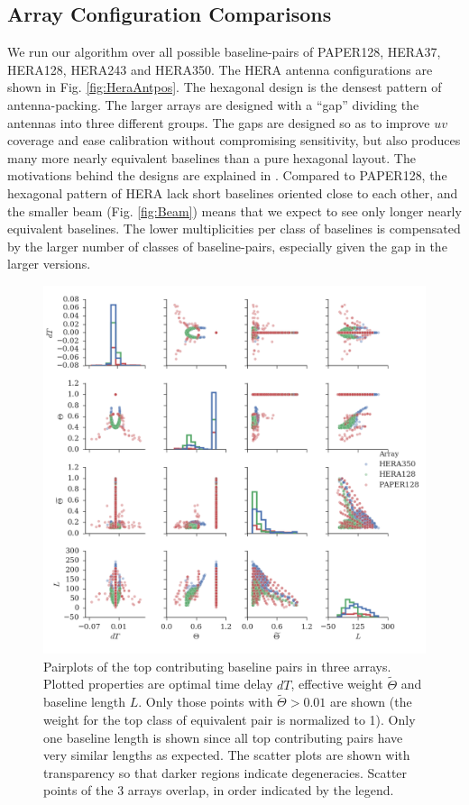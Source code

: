 \documentclass[twocolumn,apj,numberedappendix]{emulateapj}
\renewcommand\[{\begin{equation}}
\renewcommand\]{\end{equation}}
\begin{document}
\subsection{Array Configuration Comparisons \label{sec:arrconf}}
We run our algorithm over all possible baseline-pairs of  PAPER128, HERA37, HERA128, HERA243 and HERA350. The HERA antenna configurations are shown in Fig. \ref{fig:HeraAntpos}. The  
hexagonal design is the densest pattern of antenna-packing. The larger arrays are designed with a ``gap'' dividing the antennas into three different groups. The gaps are designed so as to improve $uv$ coverage and ease calibration without compromising sensitivity, but also produces many more nearly equivalent baselines than a pure hexagonal layout. The motivations behind the designs are explained in \cite{HERAconfiguration}.  Compared to PAPER128, the hexagonal pattern of HERA lack short baselines oriented close to each other, and the smaller beam (Fig. \ref{fig:Beam}) means that we expect to see only longer nearly equivalent baselines. The lower multiplicities per class of baselines is compensated by the larger number of classes of baseline-pairs, especially given the gap in the larger versions. 

\begin{figure}[H]
\includegraphics[width=\linewidth]{pairplot}

\caption{Pairplots of the top contributing baseline pairs in three arrays. Plotted properties are optimal time delay $dT$,  effective weight $\widetilde{\Theta}$ and baseline length $L$. Only those points with $\widetilde{\Theta}>0.01$ are shown (the weight for the top class of equivalent pair is normalized to 1). Only one baseline length is shown since all top contributing pairs have very similar lengths as expected. The scatter plots are shown with transparency so that darker regions indicate degeneracies. Scatter points of the 3 arrays overlap, in order indicated by the legend. }
\label{fig:pairplot}
\end{figure}
\end{document}
